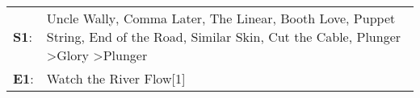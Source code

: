 \begin{supertabular}{p{0.03\textwidth}p{0.92\textwidth}}
 \textbf{S1}:  &  Uncle Wally\textsuperscript{}, \enspace Comma Later\textsuperscript{}, \enspace The Linear\textsuperscript{}, \enspace Booth Love\textsuperscript{}, \enspace Puppet String\textsuperscript{}, \enspace End of the Road\textsuperscript{}, \enspace Similar Skin\textsuperscript{}, \enspace Cut the Cable\textsuperscript{}, \enspace Plunger\textsuperscript{} \textgreater \enspace Glory\textsuperscript{} \textgreater \enspace Plunger\textsuperscript{}  \enspace  \\
 \textbf{E1}:  &                                                                                                                                                                                                                                                                                                                                                                                                                       Watch the River Flow[1]\textsuperscript{}  \enspace  \\
\end{supertabular}
